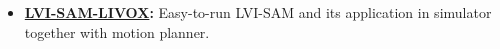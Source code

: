 \documentclass[11pt,a4paper,sans]{moderncv}        %
\begin{document}
\begin{itemize}






\item \textbf{\href{https://github.com/jianhengLiu/LVI-SAM-LIVOX}{LVI-SAM-LIVOX}:} Easy-to-run LVI-SAM and its application in simulator together with motion planner.






\end{itemize}
\end{document}
